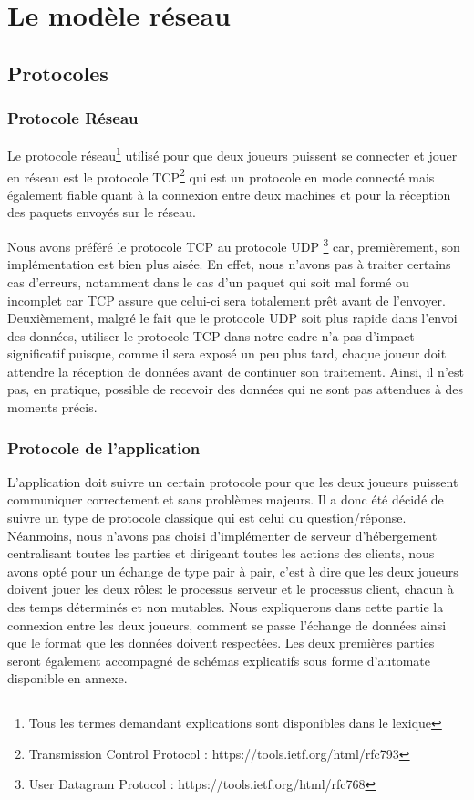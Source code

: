 \section{Le modèle réseau}

\subsection{Protocoles}
	\subsubsection{Protocole Réseau}
	Le protocole réseau\footnote{Tous les termes demandant explications sont disponibles dans le lexique} utilisé pour que deux joueurs puissent se connecter et jouer en réseau est le protocole TCP\footnote{Transmission Control Protocol : https://tools.ietf.org/html/rfc793} qui est un protocole en mode connecté mais également fiable quant à la connexion entre deux machines et pour la réception des paquets envoyés sur le réseau. \newline
	
	Nous avons préféré le protocole TCP au protocole UDP \footnote{User Datagram Protocol : https://tools.ietf.org/html/rfc768} car, premièrement, son implémentation est bien plus aisée. En effet, nous n'avons pas à traiter certains cas d'erreurs, notamment dans le cas d'un paquet qui soit mal formé ou incomplet car TCP assure que celui-ci sera totalement prêt avant de l'envoyer. \newline
	Deuxièmement, malgré le fait que le protocole UDP soit plus rapide dans l'envoi des données, utiliser le protocole TCP dans notre cadre n'a pas d'impact significatif puisque, comme il sera exposé un peu plus tard, chaque joueur doit attendre la réception de données avant de continuer son traitement. Ainsi, il n'est pas, en pratique, possible de recevoir des données qui ne sont pas attendues à des moments précis.

	\subsubsection{Protocole de l'application}
		L'application doit suivre un certain protocole pour que les deux joueurs puissent communiquer correctement et sans problèmes majeurs. Il a donc été décidé de suivre un type de protocole classique qui est celui du question/réponse. Néanmoins, nous n'avons pas choisi d'implémenter de serveur d'hébergement centralisant toutes les parties et dirigeant toutes les actions des clients, nous avons opté pour un échange de type pair à pair, c'est à dire que les deux joueurs doivent jouer les deux rôles: le processus serveur et le processus client, chacun à des temps déterminés et non mutables. \newline
		Nous expliquerons dans cette partie la connexion entre les deux joueurs, comment se passe l'échange de données ainsi que le format que les données doivent respectées. Les deux premières parties seront également accompagné de schémas explicatifs sous forme d'automate disponible en annexe.
		
